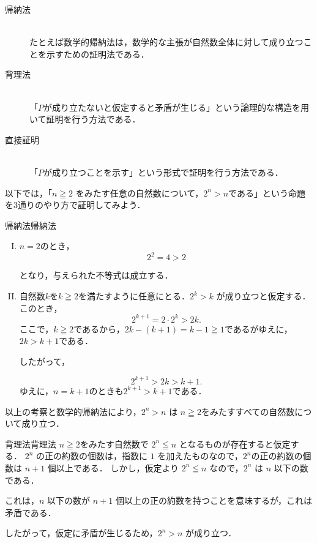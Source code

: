 \documentclass[a4paper,11pt]{ltjsarticle}
\renewcommand{\geq}{\geqq}
\begin{document}
    \begin{description}
        \item[帰納法] \mbox{} \\
        たとえば数学的帰納法は，数学的な主張が自然数全体に対して成り立つことを示すための証明法である．
        \item[背理法] \mbox{} \\
        「$P$が成り立たないと仮定すると矛盾が生じる」という論理的な構造を用いて証明を行う方法である．
        \item[直接証明] \mbox{} \\
        「$P$が成り立つことを示す」という形式で証明を行う方法である．
    \end{description}
    
    以下では，「$n \geq 2$ をみたす任意の自然数について，$2^n > n$である」という命題を3通りのやり方で証明してみよう．
    \begin{example}{帰納法}{帰納法}
      \begin{enumerate}[(I)]
      \item $n=2$のとき，
      \[
      2^2 = 4 > 2
      \]
      
      となり，与えられた不等式は成立する．
      \item 自然数$k$を$k \geqq 2$を満たすように任意にとる．$2^k > k$ が成り立つと仮定する．このとき，
      \[
      2^{k+1} = 2 \cdot 2^k > 2k.
      \]
      ここで，$k \geqq 2$であるから，$2k - (k + 1) = k - 1 \geq 1$であるがゆえに，$2k > k + 1$である．
      
      したがって，
      
      \[
      2^{k+1} > 2k > k + 1.
      \]
      ゆえに，$n=k+1$のときも$2^{k+1} > k + 1$である．
      \end{enumerate}
      
      以上の考察と数学的帰納法により，$2^n > n$ は $n \geq 2$をみたすすべての自然数について成り立つ．
      \end{example}

      \begin{example}{背理法}{背理法}
       $n \geqq 2$をみたす自然数で $2^n \leqq n$ となるものが存在すると仮定する．
        $2^n$ の正の約数の個数は，指数に $1$ を加えたものなので，$2^n$の正の約数の個数は $n + 1$ 個以上である．
        しかし，仮定より $2^n \leqq n$ なので，$2^n$ は $n$ 以下の数である．

        これは，$n$ 以下の数が $n + 1$ 個以上の正の約数を持つことを意味するが，これは矛盾である．
        
        したがって，仮定に矛盾が生じるため，$2^n > n$ が成り立つ．
      \end{example}
\end{document}

